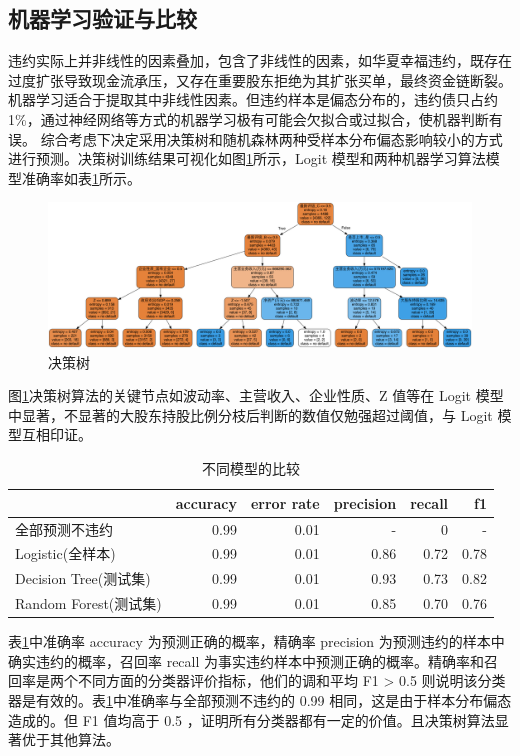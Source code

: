 \subsection{机器学习验证与比较}
违约实际上并非线性的因素叠加，包含了非线性的因素，如华夏幸福违约，既存在过度扩张导致现金流承压，又存在重要股东拒绝为其扩张买单，最终资金链断裂。
机器学习适合于提取其中非线性因素。但违约样本是偏态分布的，违约债只占约 1\%，通过神经网络等方式的机器学习极有可能会欠拟合或过拟合，使机器判断有误。
综合考虑下决定采用决策树和随机森林两种受样本分布偏态影响较小的方式进行预测。决策树训练结果可视化如图\ref{fig:decision_tree}所示，Logit 模型和两种机器学习算法模型准确率如表\ref{tab:acc}所示。


\begin{figure}[h]
	\centering
	\includegraphics[width=.9\linewidth]{./data/decision_tree.png}
	\caption{\label{fig:decision_tree}决策树}
\end{figure}

图\ref{fig:decision_tree}决策树算法的关键节点如波动率、主营收入、企业性质、Z 值等在 Logit 模型中显著，不显著的大股东持股比例分枝后判断的数值仅勉强超过阈值，与 Logit 模型互相印证。

\begin{table}
	\caption{\label{tab:acc}不同模型的比较}
	\centering
	\begin{tabular}{lrrrrr}
		                      & accuracy & error rate & precision & recall & f1   \\
		\hline
		全部预测不违约        & 0.99     & 0.01       & -         & 0      & -    \\
		Logistic(全样本)      & 0.99     & 0.01       & 0.86      & 0.72   & 0.78 \\
		Decision Tree(测试集) & 0.99     & 0.01       & 0.93      & 0.73   & 0.82 \\
		Random Forest(测试集) & 0.99     & 0.01       & 0.85      & 0.70   & 0.76 \\
	\end{tabular}
\end{table}

表\ref{tab:acc}中准确率 accuracy 为预测正确的概率，精确率 precision 为预测违约的样本中确实违约的概率，召回率 recall 为事实违约样本中预测正确的概率。精确率和召回率是两个不同方面的分类器评价指标，他们的调和平均 F1 > 0.5 则说明该分类器是有效的。表\ref{tab:acc}中准确率与全部预测不违约的 0.99 相同，这是由于样本分布偏态造成的。但 F1 值均高于 0.5 ，证明所有分类器都有一定的价值。且决策树算法显著优于其他算法。

